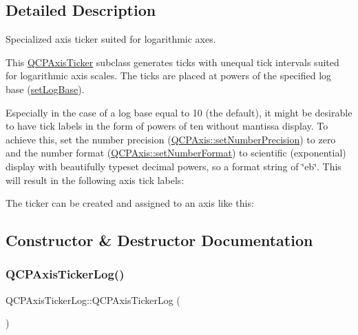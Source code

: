 \subsection{Detailed Description}
Specialized axis ticker suited for logarithmic axes. 



This \mbox{\hyperlink{class_q_c_p_axis_ticker}{Q\+C\+P\+Axis\+Ticker}} subclass generates ticks with unequal tick intervals suited for logarithmic axis scales. The ticks are placed at powers of the specified log base (\mbox{\hyperlink{class_q_c_p_axis_ticker_log_ac6e3b4e03baea3816f898869ab9751ef}{set\+Log\+Base}}).

Especially in the case of a log base equal to 10 (the default), it might be desirable to have tick labels in the form of powers of ten without mantissa display. To achieve this, set the number precision (\mbox{\hyperlink{class_q_c_p_axis_a21dc8023ad7500382ad9574b48137e63}{Q\+C\+P\+Axis\+::set\+Number\+Precision}}) to zero and the number format (\mbox{\hyperlink{class_q_c_p_axis_ae585a54dc2aac662e90a2ca82f002590}{Q\+C\+P\+Axis\+::set\+Number\+Format}}) to scientific (exponential) display with beautifully typeset decimal powers, so a format string of {\ttfamily \char`\"{}eb\char`\"{}}. This will result in the following axis tick labels\+:



The ticker can be created and assigned to an axis like this\+: 
\begin{DoxyCodeInclude}
\end{DoxyCodeInclude}


\subsection{Constructor \& Destructor Documentation}
\mbox{\label{class_q_c_p_axis_ticker_log_af3cb86ea5eef2023c0b96b5260c4cbdf}} 
\subsubsection{\texorpdfstring{Q\+C\+P\+Axis\+Ticker\+Log()}{QCPAxisTickerLog()}}
{\footnotesize\ttfamily Q\+C\+P\+Axis\+Ticker\+Log\+::\+Q\+C\+P\+Axis\+Ticker\+Log (\begin{DoxyParamCaption}{ }\end{DoxyParamCaption})}

